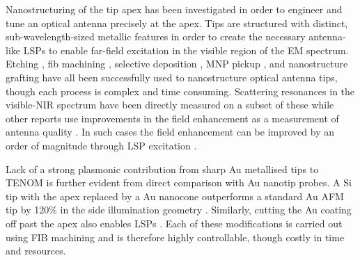 \documentclass{article}
\begin{document}
Nanostructuring of the tip apex has been investigated in order to engineer and tune an optical antenna precisely at the apex. Tips are structured with distinct, sub-wavelength-sized metallic features in order to create the necessary antenna-like LSPs to enable far-field excitation in the visible region of the EM spectrum. Etching \cite{uebel2013, kharintsev2013}, \gls{fib} machining \cite{weber2010, fleischer2011, maouli2015}, selective deposition \cite{zou2009}, MNP pickup \cite{denisyuk2012}, and nanostructure grafting \cite{huth2013} have all been successfully used to nanostructure optical antenna tips, though each process is complex and time consuming. Scattering resonances in the visible-NIR spectrum have been directly measured on a subset of these \cite{zou2009, maouli2015} while other reports use improvements in the field enhancement as a measurement of antenna quality \cite{umakoshi2012, huth2013, kharintsev2013}. In such cases the field enhancement can be improved by an order of magnitude through LSP excitation \cite{weber2010, fleischer2011, umakoshi2012}.

Lack of a strong plasmonic contribution from sharp Au metallised tips to TENOM is further evident from direct comparison with Au nanotip probes. A Si tip with the apex replaced by a Au nanocone outperforms a standard Au AFM tip by 120\% in the side illumination geometry \cite{huth2013}. Similarly, cutting the Au coating off past the apex also enables LSPs \cite{zou2009}. Each of these modifications is carried out using FIB machining and is therefore highly controllable, though costly in time and resources.
\end{document}

